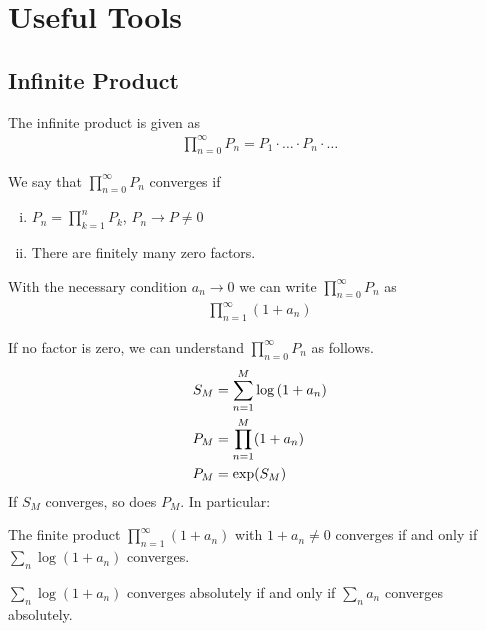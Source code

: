 \section{Useful Tools}

\vspace{1\baselineskip}

\subsection{Infinite Product}

\begin{definition}
    The infinite product is given as
    \begin{align*}
        \prod_{n=0}^\infty P_n = P_1 \cdot \dots \cdot P_n \cdot \dots
    \end{align*}
\end{definition}

\begin{theorem}
    We say that $\prod_{n=0}^\infty P_n$ converges if
    \begin{enumerate}[(i)]
        \item $P_n = \prod_{k=1}^n P_k$, $P_n \rightarrow P \neq 0$
        \item There are finitely many zero factors.
    \end{enumerate}
\end{theorem}

\begin{theorem}
    With the necessary condition $a_n \rightarrow 0$
    we can write $\prod_{n=0}^\infty P_n$ as
    \begin{align*}
        \prod_{n=1}^\infty (1+a_n)
    \end{align*}
\end{theorem}

\begin{theorem}
    If no factor is zero, we can understand $\prod_{n=0}^\infty P_n$ as follows.
    \begin{align*}
        S_M &= \sum_{n=1}^M \log \left( 1+a_n \right)
        \\
        P_M &= \prod_{n=1}^M (1+a_n)
        \\
        P_M &= \exp(S_M)
    \end{align*}
    If $S_M$ converges, so does $P_M$. In particular:
\end{theorem}

\begin{theorem}
    The finite product $\prod_{n=1}^\infty (1+a_n)$ with $1+a_n \neq 0$ converges
    if and only if $\sum_n \log (1+a_n)$ converges.
\end{theorem}

\begin{theorem}
    $\sum_n \log(1+a_n)$ converges absolutely if and only if $\sum_n a_n$ converges
    absolutely.
\end{theorem}

